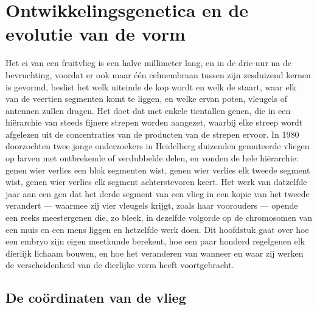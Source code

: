 \chapter{Ontwikkelingsgenetica en de evolutie van de vorm}\label{ch:b3:developmental-genetics}

Het ei van een fruitvlieg is een halve millimeter lang, en in de drie
uur na de bevruchting, voordat er ook maar één celmembraan tussen zijn
zesduizend kernen is gevormd, beslist het welk uiteinde de kop wordt en
welk de staart, waar elk van de veertien segmenten komt te liggen, en
welke ervan poten, vleugels of antennen zullen dragen. Het doet dat met
enkele tientallen genen, die in een hiërarchie van steeds fijnere
strepen worden aangezet, waarbij elke streep wordt afgelezen uit de
concentraties van de producten van de strepen ervoor. In 1980
doorzochten twee jonge onderzoekers in Heidelberg duizenden gemuteerde
vliegen op larven met ontbrekende of verdubbelde delen, en vonden de
hele hiërarchie: genen wier verlies een blok segmenten wist, genen wier
verlies elk tweede segment wist, genen wier verlies elk segment
achterstevoren keert. Het werk van datzelfde jaar aan een gen dat het
derde segment van een vlieg in een kopie van het tweede verandert ---
waarmee zij vier vleugels krijgt, zoals haar voorouders --- opende een
reeks meestergenen die, zo bleek, in dezelfde volgorde op de
chromosomen van een muis en een mens liggen en hetzelfde werk doen. Dit
hoofdstuk gaat over hoe een embryo zijn eigen meetkunde berekent, hoe
een paar honderd regelgenen elk dierlijk lichaam bouwen, en hoe het
veranderen van wanneer en waar zij werken de verscheidenheid van de
dierlijke vorm heeft voortgebracht.

\section{De coördinaten van de vlieg}


